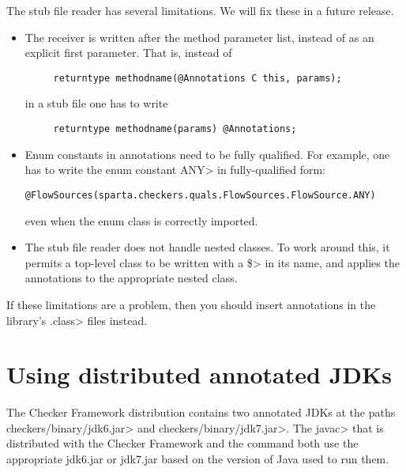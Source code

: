 The stub file reader has several limitations.  We will fix these in a
future release.

\begin{itemize}
\item 
  The receiver is written after the method parameter list, instead of as an
  explicit first parameter.  That is, instead of

\begin{Verbatim}
     returntype methodname(@Annotations C this, params);
\end{Verbatim}

\noindent
in a stub file one has to write

\begin{Verbatim}
     returntype methodname(params) @Annotations;
\end{Verbatim}

\item
  Enum constants in annotations need to be fully qualified.  For example,
  one has to write the enum constant \<ANY> in fully-qualified form:

\begin{Verbatim}
@FlowSources(sparta.checkers.quals.FlowSources.FlowSource.ANY)
\end{Verbatim}

\noindent
even when the enum class is correctly imported.

\item
  The stub file reader
  does not handle nested classes.  To work around this, it permits a
  top-level class to be written with a \<\$> in its name, and applies the
  annotations to the appropriate nested class.
\end{itemize}

If these limitations are a problem, then you should insert annotations
in the library's \<.class> files instead.



\section{Using distributed annotated JDKs\label{skeleton-using}\label{skeleton}}

The Checker Framework distribution contains two
annotated JDKs at the paths \<checkers/binary/jdk6.jar> and
\<checkers/binary/jdk7.jar>.
The \<javac> that is distributed with the Checker Framework and the command
 both use the appropriate jdk6.jar or jdk7.jar
based on the version of Java used to run them.

